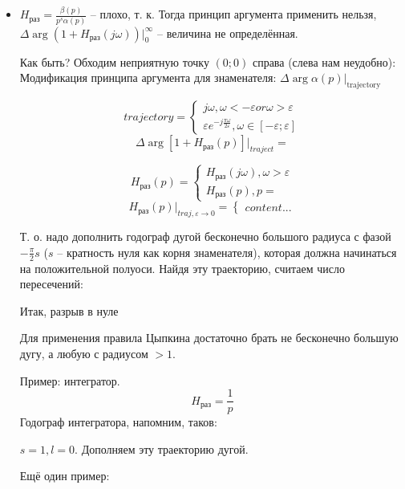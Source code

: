\documentclass[main.tex]{subfiles}
\begin{document}
\begin{itemize}[noitemsep]
    \item $ H_{\text{раз}} = \frac{\beta(p)}{p^s \alpha(p)} $ -- плохо, т. к.
    Тогда принцип аргумента применить нельзя, $ \Delta \arg (1 + H_{\text{раз}}(j \omega)) |_0^{\infty} $ -- величина не определённая.

    Как быть? %
    Обходим неприятную точку $ (0;0) $ справа (слева нам неудобно): %
    Модификация принципа аргумента для знаменателя: $\Delta \arg \alpha(p) |_{\text{trajectory}}$

    $$ trajectory = \begin{cases}
        j \omega, \omega < - \varepsilon or \omega > \varepsilon \\
        \varepsilon e^{- j \frac{\pi \omega}{ 2 \varepsilon}}, \omega \in [- \varepsilon; \varepsilon]
    \end{cases} $$
    $$ \Delta \arg [1 + H_{\text{раз}}(p)] |_{traject} =  $$

    $$ H_{\text{раз}}(p) = \begin{cases}
        H_{\text{раз}}(j \omega), \omega > \varepsilon \\
        H_{\text{раз}}(p), p = %
    \end{cases} $$
    $$ H_{\text{раз}}(p) |_{traj, \varepsilon \to 0} = \begin{cases}
        content...
    \end{cases} $$

    Т. о. надо дополнить годограф дугой бесконечно большого радиуса с фазой $ - \frac{\pi}{2}s $ ($ s $ -- кратность нуля как корня знаменателя), которая должна начинаться на положительной полуоси.
    Найдя эту траекторию, считаем число пересечений:

    Итак, разрыв в нуле %

    Для применения правила Цыпкина достаточно брать не бесконечно большую дугу, а любую с радиусом $ > 1 $.

    Пример: интегратор.
    $$ H_{\text{раз}} = \frac{1}{p} $$
    Годограф интегратора, напомним, таков:

    $ s = 1, l = 0 $.
    Дополняем эту траекторию дугой.

    Ещё один пример:
    $$  $$


\end{itemize}
\end{document}
